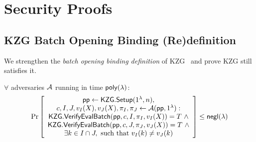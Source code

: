 \section{Security Proofs}

\subsection{KZG Batch Opening Binding (Re)definition}
\label{s:kzg-batch-def}

We strengthen the \textit{batch opening binding definition} of KZG~\cite[Sec. 3.4, pg. 9]{KZG10a} and prove KZG still satisfies it.

\begin{definition}
    \label{def:kzg:batch-opening-binding}
    $\forall$ adversaries $\mathcal{A}$ running in time $\mathsf{poly}(\lambda)$:
    \begin{align}
    \Pr \left[ \begin{array}{c}
    \mathsf{pp} \leftarrow \mathsf{KZG.Setup}(1^\lambda, n), \\
    c, I, J, v_I(X), v_J(X), \pi_I, \pi_J \leftarrow \Adv(\mathsf{pp}, 1^\lambda) : \\
    \mathsf{KZG.VerifyEvalBatch}(\mathsf{pp}, c, I, \pi_I, v_I(X)) = T\ \wedge \\
    \mathsf{KZG.VerifyEvalBatch}(\mathsf{pp}, c, J, \pi_J, v_J(X)) = T\ \wedge \\
    \exists k \in I\cap J,\ \text{such that}\ v_I(k) \ne v_J(k)
    \end{array} \right] \le \mathsf{negl}(\lambda)
    \end{align}
\end{definition}

